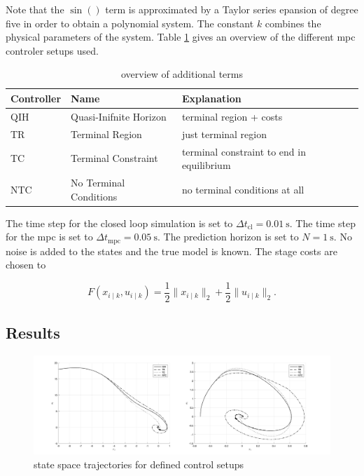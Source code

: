 \documentclass[10pt,a4paper]{article}
\begin{document}
Note that the $\sin()$ term is approximated by a Taylor series epansion of degree five in order to obtain a polynomial system. The constant $k$ combines 
the physical parameters of the system. Table \ref{tbl:controler} gives an overview of the different \gls{mpc} controler setups used.

\renewcommand{\arraystretch}{1.25}
\begin{table}[ht]
    \centering
    \captionsetup{skip=0.25cm}
    \caption{overview of additional terms}
    \label{tbl:controler}
    \begin{tabular}{|p{2cm}|p{4cm}|p{5.5cm}|}
        \hline
        \textbf{Controller} & \textbf{Name} &  \textbf{Explanation}\\
        \hline
        QIH & Quasi-Inifnite Horizon & terminal region + costs\\
        \hline
        TR & Terminal Region & just terminal region\\
        \hline
        TC & Terminal Constraint & terminal constraint to end in equilibrium\\
        \hline
        NTC & No Terminal Conditions & no terminal conditions at all\\
        \hline
    \end{tabular}
\end{table}

The time step for the closed loop simulation is set to $\Delta t_{\text{cl}} = \SI{0.01}{\second}$.  The time step for the \gls{mpc} is set to
$\Delta t_{\text{mpc}} = \SI{0.05}{\second}$. The prediction horizon is set to $N = \SI{1}{\second}$. No noise is added to the states and the true
model is known. The stage costs are chosen to

\begin{equation}
	F\left(x_{i \mid k}, u_{i \mid k}\right) = \frac{1}{2} \lVert x_{i \mid k} \rVert_2 + \frac{1}{2} \lVert u_{i \mid k} \rVert_2.
\end{equation}


\subsection{Results}


\begin{figure}[h]
	\begin{center}
		\includegraphics[width=\textwidth]{img/bb_states.png}
		\caption{state space trajectories for defined control setups}
		\label{pic:bb_state_space}
	\end{center}
\end{figure}
\end{document}
